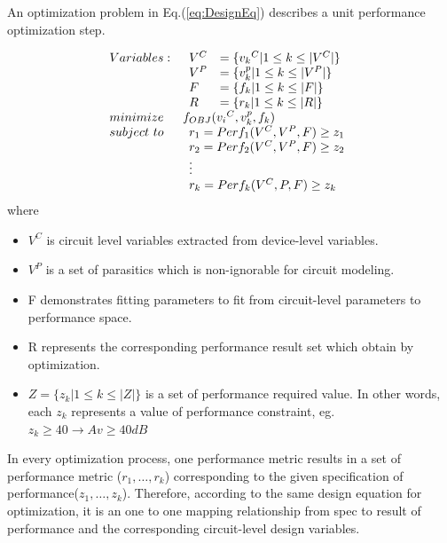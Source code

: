     An optimization problem in Eq.(\ref{eq:DesignEq}) describes a unit performance optimization step.

    \begin{align}\label{eq:DesignEq}
      \begin{array}{ll}
      Variables:  & \begin{array}[t]{ll}
                        V^C & = \{{v_k}^C | 1 \leq k \leq |V^C|\} \\
                        V^P   & = \{ v^p_k | 1 \leq k \leq |V^P| \}\\
                        F   & = \{ f_k | 1 \leq k \leq |F| \}\\
                        R   & = \{ r_k | 1 \leq k \leq |R| \} 
                    \end{array}                 \\
        minimize  &   f_{OBJ}( {v_i}^C,v^p_k,f_k)         \\
      subject\ to & \begin{array}[t]{l}
                    r_1 = Perf_1(V^C,V^P,F) \geq z_1\\
                    r_2 = Perf_2(V^C,V^P,F) \geq z_2\\
                    \vdots \\
                    r_k = Perf_k(V^C,P,F) \geq z_k
                \end{array}             
      \end{array}
    \end{align}
    where
    \begin{itemize}
      \item  $V^C$ is circuit level variables extracted from device-level variables.
      \item  $V^P$ is a set of parasitics which is non-ignorable for circuit modeling.
      \item  F demonstrates fitting parameters to fit from circuit-level parameters to performance space.
      \item  R represents the corresponding performance result set which obtain by optimization. 
      \item  $Z = \{z_k| 1 \leq k \leq |Z|\}$ is a set of performance required value. In other words, each $z_k$ represents a value of performance constraint, eg. $z_k \geq 40 \to Av \geq  40dB$
    \end{itemize}
    \vspace{0.3cm}

  
    In every optimization process, one performance metric results in a set of performance metric ($r_1 ,\ldots, r_k$) corresponding to the given specification of performance($z_1,\ldots,z_k$). Therefore, according to the same design equation for optimization, it is an one to one mapping relationship from spec to result of performance and the corresponding circuit-level design variables. 

